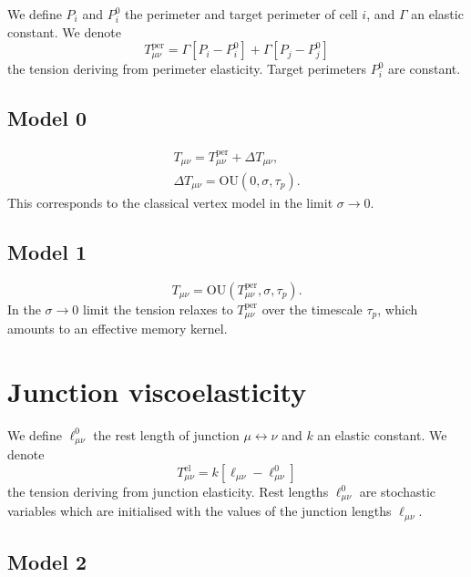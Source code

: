 \documentclass{revtex-custom}
\begin{document}
We define $P_i$ and $P_i^0$ the perimeter and target perimeter of cell $i$, and $\Gamma$ an elastic constant. We denote
\begin{equation}
T_{\mu\nu}^{\mathrm{per}} = \Gamma[P_i - P_i^0] + \Gamma[P_j - P_j^0]
\end{equation}
the tension deriving from perimeter elasticity. Target perimeters $P_i^0$ are constant.

\subsection{Model 0}

\begin{subequations}
\begin{align}
T_{\mu\nu} = T_{\mu\nu}^{\mathrm{per}} + \Delta T_{\mu\nu},\\
\Delta T_{\mu\nu} = \mathrm{OU}(0, \sigma, \tau_p).
\end{align}
\end{subequations}
This corresponds to the classical vertex model in the limit $\sigma \to 0$.

\subsection{Model 1}

\begin{equation}
T_{\mu\nu} = \mathrm{OU}(T_{\mu\nu}^{\mathrm{per}}, \sigma, \tau_p).
\end{equation}
In the $\sigma \to 0$ limit the tension relaxes to $T_{\mu\nu}^{\mathrm{per}}$ over the timescale $\tau_p$, which amounts to an effective memory kernel.

\section{Junction viscoelasticity}

We define $\ell_{\mu\nu}^0$ the rest length of junction $\mu \leftrightarrow \nu$ and $k$ an elastic constant. We denote
\begin{equation}
T_{\mu\nu}^{\mathrm{el}} = k[\ell_{\mu\nu} - \ell_{\mu\nu}^0]
\end{equation}
the tension deriving from junction elasticity. Rest lengths $\ell_{\mu\nu}^0$ are stochastic variables which are initialised with the values of the junction lengths $\ell_{\mu\nu}$.

\subsection{Model 2}
\end{document}
